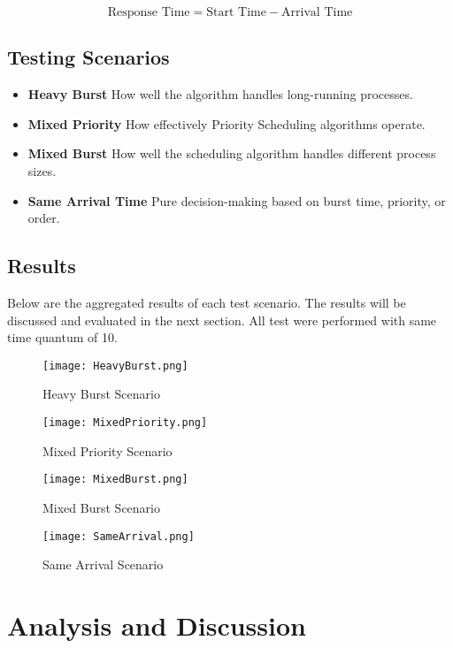 \documentclass[conference]{report}
\begin{document}
\[
\text{Response Time} = \text{Start Time} - \text{Arrival Time}
\]

\section*{Testing Scenarios}
\begin{itemize}
    \item \textbf{Heavy Burst} How well the algorithm handles long-running processes.
    \item \textbf{Mixed Priority} How effectively Priority Scheduling algorithms operate.
    \item \textbf{Mixed Burst} How well the scheduling algorithm handles different process sizes.
    \item \textbf{Same Arrival Time} Pure decision-making based on burst time, priority, or order.
\end{itemize}

\section*{Results}
Below are the aggregated results of each test scenario. The results will be discussed and evaluated in the next section. All test were performed with same time quantum of 10.

\begin{figure}
    \centering
    \texttt{[image: HeavyBurst.png]}
    \caption{Heavy Burst Scenario}
    \label{fig:enter-label}
\end{figure}
\begin{figure}
    \centering
    \texttt{[image: MixedPriority.png]}
    \caption{Mixed Priority Scenario}
    \label{fig:enter-label}
\end{figure}
\begin{figure}
    \centering
    \texttt{[image: MixedBurst.png]}
    \caption{Mixed Burst Scenario}
    \label{fig:enter-label}
\end{figure}
\begin{figure}
    \centering
    \texttt{[image: SameArrival.png]}
    \caption{Same Arrival Scenario}
    \label{fig:enter-label}
\end{figure}

\chapter{Analysis and Discussion}
\end{document}
